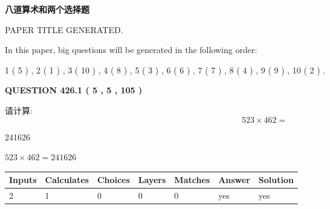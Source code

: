 \documentclass{ctexart}
\begin{document}
   
\vspace{0.2in}
   
   
   
   
   
   
   
   
 \vspace{0.2in}
{\LARGE {\textbf{ 八道算术和两个选择题}}}
   
   
 PAPER TITLE GENERATED.
   
   
   
\vspace{0.2in}
   
In this paper, big questions will be generated in the following order: 
   
   
   1 ( 5 )
 ,
   2 ( 1 )
 ,
   3 ( 10 )
 ,
   4 ( 8 )
 ,
   5 ( 3 )
 ,
   6 ( 6 )
 ,
   7 ( 7 )
 ,
   8 ( 4 )
 ,
   9 ( 9 )
 ,
   10 ( 2 )
 .
  
\vspace{0.2in}
  
{\textbf{\Large{QUESTION
426.1 
 ( 5 , 5 , 105 )
}}}
  
  
 
请计算:
\begin{equation}
523  \times    %
462 = \nonumber
\end{equation}
 
 
 
\noindent{}
 
 

241626
 
 
\noindent{}
 
 

 
 
 
\noindent{}
 
 

$ %
523 \times  %
462=   %
241626$
 
 
\noindent{}
 
 

 
   
   
   
   
\noindent\begin{tabular}{|l|l|l|l|l|l|l|}
 \hline
Inputs & Calculates & Choices & Layers & Matches & Answer & Solution \\ \hline
 2  & 
 1  & 
 0
  & 
 0  & 
 0  & 
  yes & 
  yes 
  \\ \hline
 \end{tabular}
   
\end{document}
